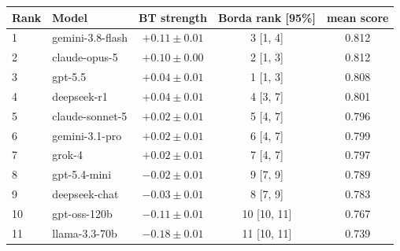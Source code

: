 \begin{tabular}{llccc}
\toprule
Rank & Model & BT strength & Borda rank [95\%] & mean score \\
\midrule
1 & gemini-3.8-flash & $+0.11 \pm 0.01$ & 3 [1, 4] & 0.812 \\
2 & claude-opus-5 & $+0.10 \pm 0.00$ & 2 [1, 3] & 0.812 \\
3 & gpt-5.5 & $+0.04 \pm 0.01$ & 1 [1, 3] & 0.808 \\
4 & deepseek-r1 & $+0.04 \pm 0.01$ & 4 [3, 7] & 0.801 \\
5 & claude-sonnet-5 & $+0.02 \pm 0.01$ & 5 [4, 7] & 0.796 \\
6 & gemini-3.1-pro & $+0.02 \pm 0.01$ & 6 [4, 7] & 0.799 \\
7 & grok-4 & $+0.02 \pm 0.01$ & 7 [4, 7] & 0.797 \\
8 & gpt-5.4-mini & $-0.02 \pm 0.01$ & 9 [7, 9] & 0.789 \\
9 & deepseek-chat & $-0.03 \pm 0.01$ & 8 [7, 9] & 0.783 \\
10 & gpt-oss-120b & $-0.11 \pm 0.01$ & 10 [10, 11] & 0.767 \\
11 & llama-3.3-70b & $-0.18 \pm 0.01$ & 11 [10, 11] & 0.739 \\
\bottomrule
\end{tabular}
